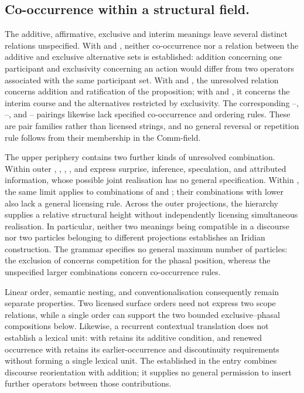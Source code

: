 \subsection{Co-occurrence within a structural field.}
The additive, affirmative, exclusive and interim meanings leave several distinct relations
unspecified. With  and , neither
co-occurrence nor a relation between the additive and exclusive alternative
sets is established: addition concerning one participant and exclusivity
concerning an action would differ from two operators associated with the
same participant set. With  and , the unresolved
relation concerns addition and ratification of the proposition; with
 and , it concerns the interim course
and the alternatives restricted by exclusivity. The corresponding
--, --, and
-- pairings likewise lack specified
co-occurrence and ordering rules. These are pair families rather than
licensed strings, and no general reversal or repetition rule follows from
their membership in the Comm-field.

The upper periphery contains two further kinds of unresolved combination.
Within outer , , , ,
and  express surprise, inference, speculation, and attributed
information, whose possible joint realisation has no general specification.
Within , the same limit applies to combinations of
 and ; their combinations with lower 
also lack a general licensing rule. Across the outer projections,
the hierarchy supplies a relative structural height without independently
licensing simultaneous realisation. In particular, neither two meanings
being compatible in a discourse nor two particles belonging to different
projections establishes an Iridian construction. The grammar specifies no
general maximum number of particles: the exclusion of 
concerns competition for the phasal position, whereas the unspecified
larger combinations concern co-occurrence rules.

Linear order, semantic nesting, and conventionalisation consequently remain
separate properties. Two licensed surface orders need not express two
scope relations, while a single order can support the two bounded
exclusive--phasal compositions below. Likewise, a recurrent contextual
translation does not establish a lexical unit:  with
 retains its additive condition, and renewed occurrence with
 retains its earlier-occurrence and discontinuity
requirements without forming a single lexical unit. The
established  in the  entry combines
discourse reorientation with addition; it supplies no general permission
to insert further operators between those contributions.

